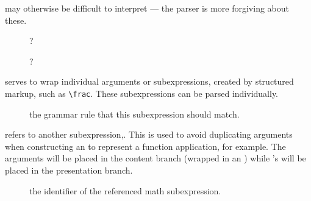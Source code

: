 \documentclass{article}
\begin{document}
\begin{description}
  may otherwise be difficult to interpret --- the parser is more forgiving about these.
  \begin{description}
    \item[] ?
    \item[] ?
  \end{description}
\item[\tag{XMArg}] serves to wrap individual arguments or subexpressions, created by
  structured markup, such as \verb|\frac|.  These subexpressions can be parsed individually.
  \begin{description}
    \item[] the grammar rule that this subexpression should match.
  \end{description}
\item[\tag{XMRef}] refers to another subexpression,.  This is used to avoid duplicating
  arguments when constructing an  to represent a function application, for example.  
  The arguments will be placed in the content branch (wrapped in an ) while
  's will be placed in the presentation branch.
  \begin{description}
    \item[] the identifier of the referenced math subexpression.
  \end{description}
\end{description}
\end{document}
